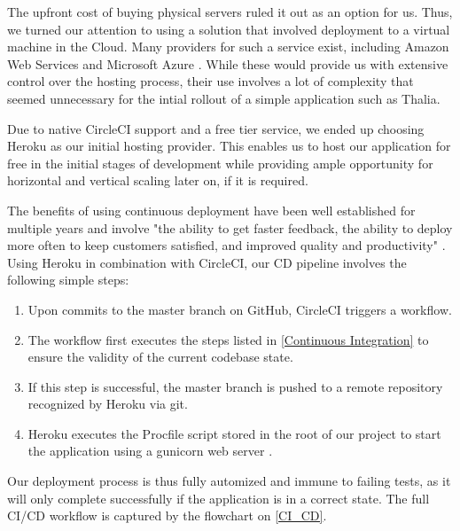 \documentclass[main.tex]{subfiles}
\begin{document}
The upfront cost of buying physical servers ruled it out as an option for us. Thus, we turned our attention to using a solution that involved deployment to a virtual machine in the Cloud. Many providers for such a service exist, including Amazon Web Services \cite{AWS} and Microsoft Azure \cite{Azure}. While these would provide us with extensive control over the hosting process, their use involves a lot of complexity that seemed unnecessary for the intial rollout of a simple application such as Thalia.

Due to native CircleCI support and a free tier service, we ended up choosing Heroku \cite{Heroku} as our initial hosting provider. This enables us to host our application for free in the initial stages of development while providing ample opportunity for horizontal and vertical scaling later on, if it is required.

The benefits of using continuous deployment have been well established for multiple years and involve "the ability to get faster feedback, the ability to deploy more often to keep customers satisfied, and improved quality and productivity" \cite{CDBenefits}. Using Heroku in combination with CircleCI, our CD pipeline involves the following simple steps:

\begin{enumerate}
    \item Upon commits to the master branch on GitHub, CircleCI triggers a workflow.
    \item The workflow first executes the steps listed in \ref{Continuous Integration} to ensure the validity of the current codebase state.
    \item If this step is successful, the master branch is pushed to a remote repository recognized by Heroku via git.
    \item Heroku executes the Procfile script stored in the root of our project to start the application using a gunicorn web server \cite{Gunicorn}.
\end{enumerate}

Our deployment process is thus fully automized and immune to failing tests, as it will only complete successfully if the application is in a correct state. The full CI/CD workflow is captured by the flowchart on \figurename{\ref{CI_CD}}.
\end{document}

